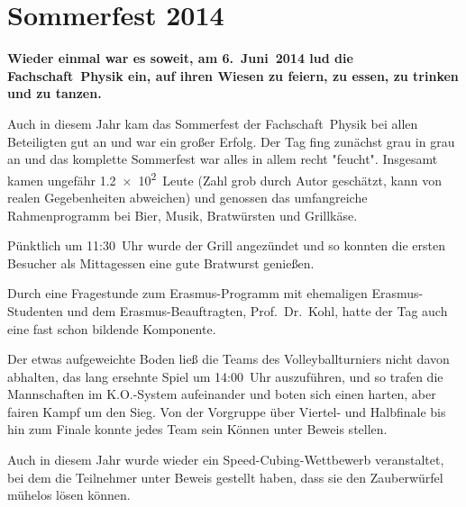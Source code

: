 
\section{Sommerfest 2014}
\begin{multicols*}{2}
\setlength{\parskip}{2\parskip}

\textbf{Wieder einmal war es soweit, am 6.~Juni~2014 lud die Fachschaft~Physik ein, auf ihren Wiesen zu feiern, zu essen, zu trinken und zu tanzen.}

\medskip

Auch in diesem Jahr kam das Sommerfest der Fachschaft~Physik bei allen Beteiligten gut an und war ein großer Erfolg. Der Tag fing zunächst grau in grau an und das komplette Sommerfest war alles in allem recht "feucht". Insgesamt kamen ungefähr \num{1,2e2}~Leute (Zahl grob durch Autor geschätzt, kann von realen Gegebenheiten abweichen) und genossen das umfangreiche Rahmenprogramm bei Bier, Musik, Bratwürsten und Grillkäse.

{%
\setlength{\columnsep}{0cm}
\begin{wrapfigure}{r}[0.5cm]{0cm}
\end{wrapfigure}
Pünktlich um 11:30~Uhr wurde der Grill angezündet und so konnten die ersten Besucher als Mittagessen eine gute Bratwurst genießen.

Durch eine Fragestunde zum Erasmus-Programm mit ehemaligen Erasmus-Studenten und dem Erasmus-Beauftragten, Prof.\ Dr.\ Kohl, hatte der Tag auch eine fast schon bildende Komponente.

Der etwas aufgeweichte Boden ließ die Teams des Volleyballturniers nicht davon abhalten, das lang ersehnte Spiel um 14:00~Uhr auszuführen, und so trafen die Mannschaften im K.O.-System aufeinander und boten sich einen harten, aber fairen Kampf um den Sieg. Von der Vorgruppe über Viertel- und Halbfinale bis hin zum Finale konnte jedes Team sein Können unter Beweis stellen.}

Auch in diesem Jahr wurde wieder ein Speed-Cubing-Wettbewerb veranstaltet, bei dem die Teilnehmer unter Beweis gestellt haben, dass sie den Zauberwürfel mühelos lösen können.


\end{multicols*}
